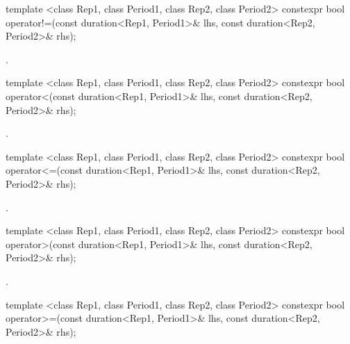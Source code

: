 %
\begin{itemdecl}
template <class Rep1, class Period1, class Rep2, class Period2>
  constexpr bool operator!=(const duration<Rep1, Period1>& lhs,
                            const duration<Rep2, Period2>& rhs);
\end{itemdecl}

\begin{itemdescr}
\pnum
\returns {}.
\end{itemdescr}

%
\begin{itemdecl}
template <class Rep1, class Period1, class Rep2, class Period2>
  constexpr bool operator<(const duration<Rep1, Period1>& lhs,
                           const duration<Rep2, Period2>& rhs);
\end{itemdecl}

\begin{itemdescr}
\pnum
\returns {}.
\end{itemdescr}

%
\begin{itemdecl}
template <class Rep1, class Period1, class Rep2, class Period2>
  constexpr bool operator<=(const duration<Rep1, Period1>& lhs,
                            const duration<Rep2, Period2>& rhs);
\end{itemdecl}

\begin{itemdescr}
\pnum
\returns {}.
\end{itemdescr}

%
\begin{itemdecl}
template <class Rep1, class Period1, class Rep2, class Period2>
  constexpr bool operator>(const duration<Rep1, Period1>& lhs,
                           const duration<Rep2, Period2>& rhs);
\end{itemdecl}

\begin{itemdescr}
\pnum
\returns {}.
\end{itemdescr}

%
\begin{itemdecl}
template <class Rep1, class Period1, class Rep2, class Period2>
  constexpr bool operator>=(const duration<Rep1, Period1>& lhs,
                            const duration<Rep2, Period2>& rhs);
\end{itemdecl}

